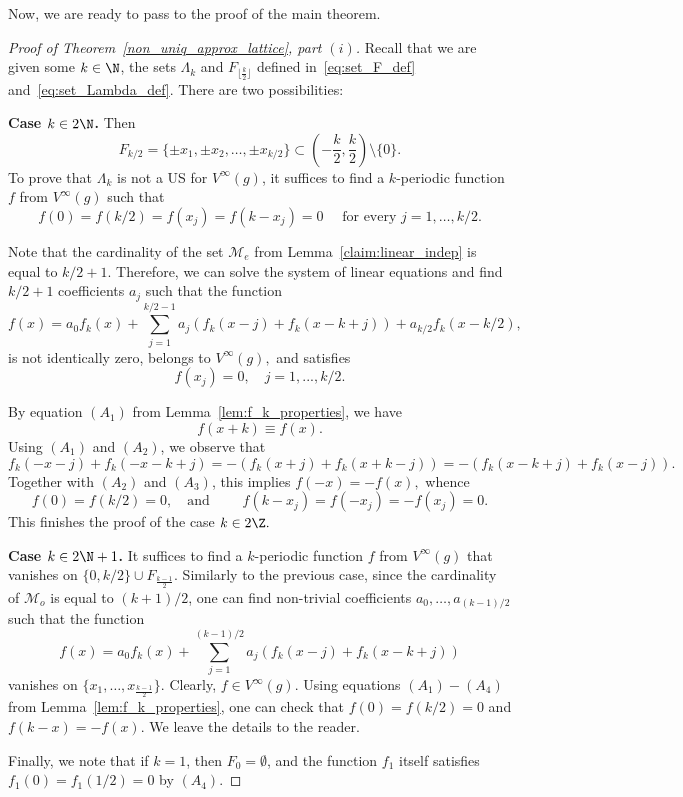 \documentclass[12pt]{amsart}
\numberwithin{equation}{section}
\begin{document}
Now, we are ready to pass to the proof of the main theorem. 
\begin{proof}[Proof of Theorem~\ref{non_uniq_approx_lattice}, part $(i)$]
Recall that we are given some $k \in \N$, the sets $\Lambda_k$ and $F_{\lfloor\frac{k}{2}\rfloor}$ defined in~\eqref{eq:set_F_def} and~\eqref{eq:set_Lambda_def}. 
There are two possibilities:

{\bf Case $k \in 2\N$.} Then $$F_{k/2}  =\{\pm x_1, \pm x_2, \dots, \pm x_{k/2}\} \subset \left(-\frac{k}{2},\frac{k}{2}\right) \setminus \{0\}.$$
To prove that $\Lambda_k$ is not a US for $V^{\infty}(g)$, it suffices to find a $k$-periodic function $f$ from $V^{\infty}(g)$ such that
$$f(0) = f(k/2) = f(x_j) = f(k-x_j) = 0 \quad \text{ for every } j = 1, \dots, k/2.$$

Note that the cardinality of the set $\mathcal{M}_e$ from Lemma~\ref{claim:linear_indep} is equal to $k/2+1.$
Therefore, we can solve the system of linear equations and find $k/2+1$ coefficients $a_j$ such that the function 
\begin{equation}\label{eq:f_def_aj}
  f(x)=a_0 f_k(x)+\sum_{j=1}^{k/2-1}a_j(f_k(x-j)+f_k(x-k+j))+a_{k/2}f_{k}(x-k/2),  
\end{equation}
is not identically zero, belongs to $V^{\infty}(g),$ and satisfies
\begin{equation}\label{eq:f_vanishes_F}
    f(x_j)=0, \quad j=1,...,k/2.
\end{equation}

By equation $(A_1)$ from Lemma~\ref{lem:f_k_properties},  we have \begin{equation}\label{eq:f_is_k_periodic}
 f(x+k)\equiv f(x).   
\end{equation} 
Using $(A_1)$ and $(A_2)$, we observe that
$$f_k(-x-j)+f_k(-x-k+j)=-(f_k(x+j)+f_k(x+k-j))=-(f_k(x-k+j)+f_k(x-j)).$$ Together with $(A_2)$ and $(A_3)$, this implies $f(-x)=-f(x),$ whence
\begin{equation}
    f(0)=f(k/2)=0, \quad \text{and } \quad  \quad f(k-x_j) =f(-x_j) = - f(x_j) = 0. 
\end{equation}
This finishes the proof of the case $k \in 2\Z.$

{\bf Case $k \in 2\N+1$.}  It suffices to find a $k$-periodic function $f$ from $V^\infty(g)$ that vanishes on $\{0, k/2\} \cup F_{\frac{k-1}{2}}.$ Similarly to the previous case, since the cardinality of $\mathcal{M}_o$ is equal to $(k+1)/2$, one can find non-trivial coefficients $a_0, \dots, a_{(k-1)/2}$ such that the function 
$$f(x)=a_0 f_k(x)+\sum_{j=1}^{(k-1)/2}a_j(f_k(x-j)+f_k(x-k+j))$$ vanishes on $\{x_1, \dots, x_{\frac{k-1}{2}}\}.$ Clearly, $f\in V^{\infty}(g).$
Using equations $(A_1)-(A_4)$ from Lemma~\ref{lem:f_k_properties}, one can check that $f(0)=f(k/2)=0$ and $f(k-x)=-f(x).$
We leave the details to the reader.

Finally, we note that if $k=1$, then $F_0=\emptyset$, and the function $f_1$ itself satisfies
$f_1(0)=f_1(1/2)=0$ by $(A_4)$. 
\end{proof}
\end{document}
